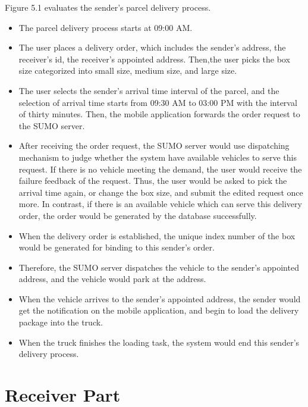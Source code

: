 \documentclass[12pt]{ksthesis}
\begin{document}
\begin{thesis}
{Figure 5.1 evaluates the sender’s parcel delivery process.


\begin{itemize}
\item
The parcel delivery process starts at 09:00 AM.

\item
The user places a delivery order, which includes the sender’s address, the receiver’s id, the receiver’s appointed address. Then,the user picks the box size categorized into small size, medium size, and large size.


\item
The user selects the sender’s arrival time interval of the parcel, and the selection of arrival time starts from 09:30 AM to 03:00 PM with the interval of thirty minutes. Then, the mobile application forwards the order request to the SUMO server.

\item
After receiving the order request, the SUMO server would use dispatching mechanism to judge whether the system have available vehicles to serve this request. If there is no vehicle meeting the demand, the user would receive the failure feedback of the request. Thus, the user would be asked to pick the arrival time again, or change the box size, and submit the edited request once more.
In contrast, if there is an available vehicle which can serve this delivery order, the order would be generated by the database successfully.

\item
When the delivery order is established, the unique index number of the box would be generated for binding to this sender’s order.

\item
Therefore, the SUMO server dispatches the vehicle to the sender’s appointed address, and the vehicle would park at the address.

\item
When the vehicle arrives to the sender’s appointed address, the sender would get the notification on the mobile application, and begin to load the delivery package into the truck.

\item
When the truck finishes the loading task, the system would end this sender’s delivery process.

\end{itemize}

\section{Receiver Part}

}
\end{thesis}
\end{document}
